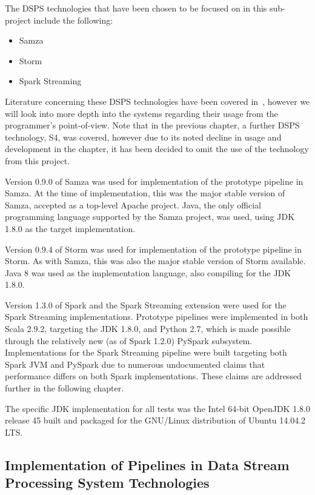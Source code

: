 The DSPS technologies that have been chosen to be focused on in this sub-project include the following:

\begin{itemize}
  \item Samza
  \item Storm
  \item Spark Streaming
\end{itemize}

Literature concerning these DSPS technologies have been covered in~, however
we will look into more depth into the systems regarding their usage from the programmer's point-of-view. Note that
in the previous chapter, a further DSPS technology, S4, was covered, however due to its noted decline in usage and
development in the chapter, it has been decided to omit the use of the technology from this project.

Version 0.9.0 of Samza was used for implementation of the prototype pipeline in Samza. At the time of implementation,
this was the major stable version of Samza, accepted as a top-level Apache project. Java, the only official programming
language supported by the Samza project, was used, using JDK 1.8.0 as the target implementation.

Version 0.9.4 of Storm was used for implementation of the prototype pipeline in Storm. As with Samza, this was also the
major stable version of Storm available. Java 8 was used as the implementation language, also compiling for the JDK 1.8.0.

Version 1.3.0 of Spark and the Spark Streaming extension were used for the Spark Streaming implementations. Prototype pipelines were
implemented in both Scala 2.9.2, targeting the JDK 1.8.0, and Python 2.7, which is made possible through the relatively new (as of Spark 1.2.0)
PySpark subsystem. Implementations for the Spark Streaming pipeline were built targeting both Spark JVM and PySpark due
to numerous undocumented claims that performance differs on both Spark implementations. These claims are addressed further
in the following chapter.

The specific JDK implementation for all tests was the Intel 64-bit OpenJDK 1.8.0 release 45 built and packaged for the GNU/Linux
distribution of Ubuntu 14.04.2 LTS.




\subsection{Implementation of Pipelines in Data Stream Processing System Technologies} %
\label{sub:implementation_of_pipelines_in_dsps_technol}

